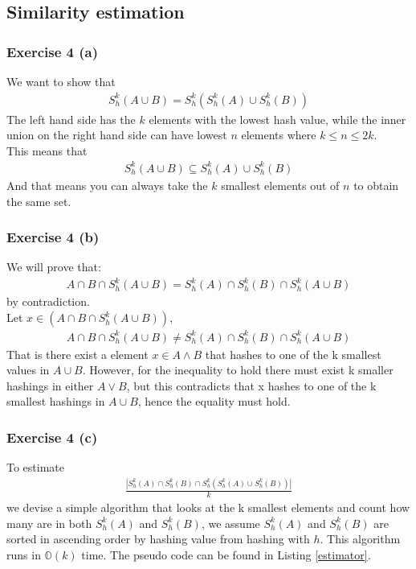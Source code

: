 \documentclass[a4paper]{article}
\begin{document}
\subsection*{Similarity estimation}
\subsubsection*{Exercise 4 (a)}
We want to show that
\begin{align*}
S_h^k(A\cup B)=S_h^k(S_h^k(A)\cup S_h^k(B))
\end{align*}
The left hand side has the $k$ elements with the lowest hash value, while the inner union on the right hand side can have lowest $n$ elements where $k\leq n\leq 2k$. \\
This means that
\begin{align}\label{3a}
S_h^k(A\cup B)\subseteq S_h^k(A)\cup S_h^k(B)
\end{align}
And that means you can always take the $k$ smallest elements out of $n$ to obtain the same set.

\subsubsection*{Exercise 4 (b)}
We will prove that:
\begin{align*}
A \cap B \cap S_h^k(A\cup B) = S_h^k(A) \cap S_h^k(B) \cap S_h^k(A\cup B)
\end{align*}
by contradiction.\\
Let \(x \in (A \cap B \cap S_h^k(A\cup B))\),
\begin{align*}
A \cap B \cap S_h^k(A\cup B) \neq S_h^k(A) \cap S_h^k(B) \cap S_h^k(A\cup B)
\end{align*}
That is there exist a element \(x \in A \wedge B\) that hashes to one of the k smallest values in \(A\cup B\). However, for the inequality to hold there must exist k smaller hashings in either \(A \vee B\), but this contradicts that x hashes to one of the k smallest hashings in \(A\cup B\), hence the equality must hold.
\subsubsection*{Exercise 4 (c)}
To estimate
\begin{align}\label{unbiased}
\frac{\left|S_h^k(A) \cap S_h^k(B) \cap S_h^k(S_h^k(A)\cup S_h^k(B))\right|}{k}
\end{align}
we devise a simple algorithm that looks at the k smallest elements and count how many are in both \(S_h^k(A) \) and \(S_h^k(B)\), we assume \(S_h^k(A)\) and \(S_h^k(B)\) are sorted in ascending order by hashing value from hashing with \(h\). This algorithm runs in \(\mathbb{O}(k)\) time. The pseudo code can be found in Listing \ref{estimator}.

\end{document}
